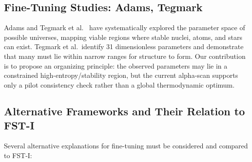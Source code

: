 \documentclass[12pt,a4paper]{article}
\theoremstyle{remark}
\begin{document}
\subsection{Fine-Tuning Studies: Adams, Tegmark}

Adams \citep{Adams2019} and Tegmark et al.\ \citep{Tegmark2006} have systematically explored the parameter space of possible universes, mapping viable regions where stable nuclei, atoms, and stars can exist. Tegmark et al.\ identify 31 dimensionless parameters and demonstrate that many must lie within narrow ranges for structure to form. Our contribution is to propose an organizing principle: the observed parameters may lie in a constrained high-entropy/stability region, but the current alpha-scan supports only a pilot consistency check rather than a global thermodynamic optimum.

\subsection{Alternative Frameworks and Their Relation to FST-I}

Several alternative explanations for fine-tuning must be considered and compared to FST-I:
\end{document}
